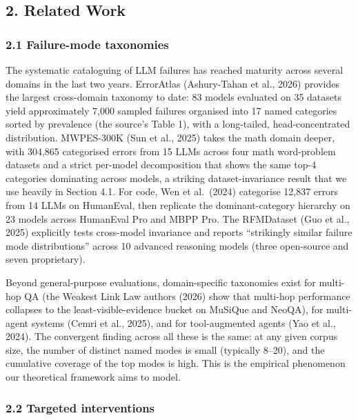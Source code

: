 \documentclass[
]{article}
\begin{document}
\subsection{2. Related Work}\label{related-work}

\subsubsection{2.1 Failure-mode
taxonomies}\label{failure-mode-taxonomies}

The systematic cataloguing of LLM failures has reached maturity across
several domains in the last two years. ErrorAtlas (Ashury-Tahan et al.,
2026) provides the largest cross-domain taxonomy to date: 83 models
evaluated on 35 datasets yield approximately 7,000 sampled failures
organised into 17 named categories sorted by prevalence (the source's
Table 1), with a long-tailed, head-concentrated distribution. MWPES-300K
(Sun et al., 2025) takes the math domain deeper, with 304,865
categorised errors from 15 LLMs across four math word-problem datasets
and a strict per-model decomposition that shows the same top-4
categories dominating across models, a striking dataset-invariance
result that we use heavily in Section 4.1. For code, Wen et al.~(2024)
categorise 12,837 errors from 14 LLMs on HumanEval, then replicate the
dominant-category hierarchy on 23 models across HumanEval Pro and MBPP
Pro. The RFMDataset (Guo et al., 2025) explicitly tests cross-model
invariance and reports ``strikingly similar failure mode distributions''
across 10 advanced reasoning models (three open-source and seven
proprietary).

Beyond general-purpose evaluations, domain-specific taxonomies exist for
multi-hop QA (the Weakest Link Law authors (2026) show that multi-hop
performance collapses to the least-visible-evidence bucket on MuSiQue
and NeoQA), for multi-agent systems (Cemri et al., 2025), and for
tool-augmented agents (Yao et al., 2024). The convergent finding across
all these is the same: at any given corpus size, the number of distinct
named modes is small (typically 8--20), and the cumulative coverage of
the top modes is high. This is the empirical phenomenon our theoretical
framework aims to model.

\subsubsection{2.2 Targeted interventions}\label{targeted-interventions}
\end{document}
